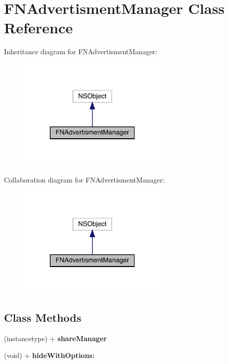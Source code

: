 \hypertarget{interface_f_n_advertisment_manager}{}\section{F\+N\+Advertisment\+Manager Class Reference}
\label{interface_f_n_advertisment_manager}


Inheritance diagram for F\+N\+Advertisment\+Manager\+:\nopagebreak
\begin{figure}[H]
\begin{center}
\leavevmode
\includegraphics[width=207pt]{interface_f_n_advertisment_manager__inherit__graph}
\end{center}
\end{figure}


Collaboration diagram for F\+N\+Advertisment\+Manager\+:\nopagebreak
\begin{figure}[H]
\begin{center}
\leavevmode
\includegraphics[width=207pt]{interface_f_n_advertisment_manager__coll__graph}
\end{center}
\end{figure}
\subsection*{Class Methods}
\begin{DoxyCompactItemize}
\item 
\mbox{\label{interface_f_n_advertisment_manager_acb63bf95f80d8472969b186640b57f89}} 
(instancetype) + {\bfseries share\+Manager}
\item 
\mbox{\label{interface_f_n_advertisment_manager_a14b89cc80f1b3aafb9d4a36943551691}} 
(void) + {\bfseries hide\+With\+Options\+:}
\end{DoxyCompactItemize}
